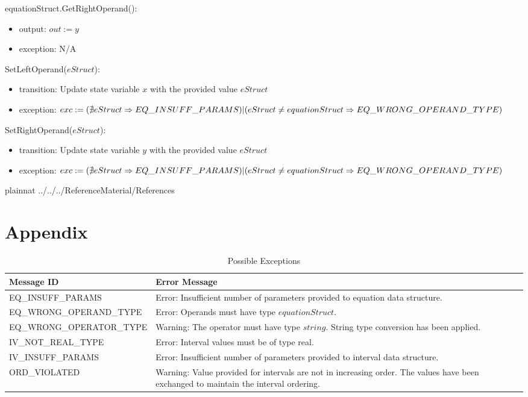 \documentclass[12pt, titlepage]{article}
\begin{document}
\noindent equationStruct.GetRightOperand():
\begin{itemize}
	\item output: $out := y$
	\item exception: N/A
\end{itemize}

\noindent SetLeftOperand($eStruct$):
\begin{itemize}
	\item transition: Update state variable $x$ with the provided value 
	$eStruct$
	\item exception: $exc := \\
	(\nexists eStruct \Rightarrow EQ\_INSUFF\_PARAMS)\\
	|\\
	(eStruct \neq equationStruct \Rightarrow EQ\_WRONG\_OPERAND\_TYPE)$	
\end{itemize}

\noindent SetRightOperand($eStruct$):
\begin{itemize}
	\item transition: Update state variable $y$ with the provided value 
	$eStruct$
	\item exception: $exc := \\
	(\nexists eStruct \Rightarrow EQ\_INSUFF\_PARAMS)\\
	|\\
	(eStruct \neq equationStruct \Rightarrow EQ\_WRONG\_OPERAND\_TYPE)$	
\end{itemize}

\newpage

 {plainnat}
 {../../../ReferenceMaterial/References}

\newpage

\section{Appendix} \label{Appendix}

\renewcommand{\arraystretch}{1.2}

\begin{longtable}{l p{9.5cm}}
	\caption{Possible Exceptions} \\
	\toprule
	\textbf{Message ID} & \textbf{Error Message} \\
	\midrule
	EQ\_INSUFF\_PARAMS & Error: Insufficient number of parameters provided to 
	equation data structure.\\
	EQ\_WRONG\_OPERAND\_TYPE & Error: Operands must have type 
	$equationStruct$.\\
	EQ\_WRONG\_OPERATOR\_TYPE & Warning: The operator must have type $string$. 
	String type conversion has been applied.\\
	IV\_NOT\_REAL\_TYPE & Error: Interval values must be of type real. \\
	IV\_INSUFF\_PARAMS & Error: Insufficient number of parameters provided to 
	interval data structure. \\
	ORD\_VIOLATED & Warning: Value provided for intervals are not in increasing 
	order. The values have been exchanged to maintain the interval ordering. \\
	\bottomrule
\end{longtable}
\end{document}

